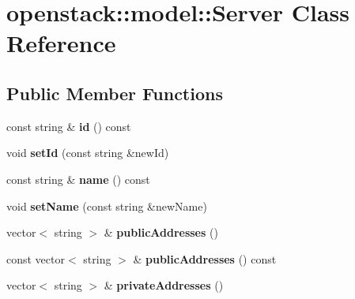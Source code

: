 \hypertarget{classopenstack_1_1model_1_1Server}{
\section{openstack::model::Server Class Reference}
\label{classopenstack_1_1model_1_1Server}
}
\subsection*{Public Member Functions}
\begin{DoxyCompactItemize}
\item 
\hypertarget{classopenstack_1_1model_1_1Server_a19aa627c1d6a4549d2d280ccf035f77b}{
const string \& {\bfseries id} () const }
\label{classopenstack_1_1model_1_1Server_a19aa627c1d6a4549d2d280ccf035f77b}

\item 
\hypertarget{classopenstack_1_1model_1_1Server_a35fd47ecfa9382139a501572a40fff21}{
void {\bfseries setId} (const string \&newId)}
\label{classopenstack_1_1model_1_1Server_a35fd47ecfa9382139a501572a40fff21}

\item 
\hypertarget{classopenstack_1_1model_1_1Server_a7b9cb800818fcb32ac54832cc92e0632}{
const string \& {\bfseries name} () const }
\label{classopenstack_1_1model_1_1Server_a7b9cb800818fcb32ac54832cc92e0632}

\item 
\hypertarget{classopenstack_1_1model_1_1Server_ad19d2f38a8326e9c338336605413f6c5}{
void {\bfseries setName} (const string \&newName)}
\label{classopenstack_1_1model_1_1Server_ad19d2f38a8326e9c338336605413f6c5}

\item 
\hypertarget{classopenstack_1_1model_1_1Server_a61beea210dfdebc1903e14b15a372324}{
vector$<$ string $>$ \& {\bfseries publicAddresses} ()}
\label{classopenstack_1_1model_1_1Server_a61beea210dfdebc1903e14b15a372324}

\item 
\hypertarget{classopenstack_1_1model_1_1Server_ac6cd76ecb639d7600280a5b0749c1211}{
const vector$<$ string $>$ \& {\bfseries publicAddresses} () const }
\label{classopenstack_1_1model_1_1Server_ac6cd76ecb639d7600280a5b0749c1211}

\item 
\hypertarget{classopenstack_1_1model_1_1Server_a3b78a8a6084870b2ac06db671953098f}{
vector$<$ string $>$ \& {\bfseries privateAddresses} ()}
\label{classopenstack_1_1model_1_1Server_a3b78a8a6084870b2ac06db671953098f}


\end{DoxyCompactItemize}
